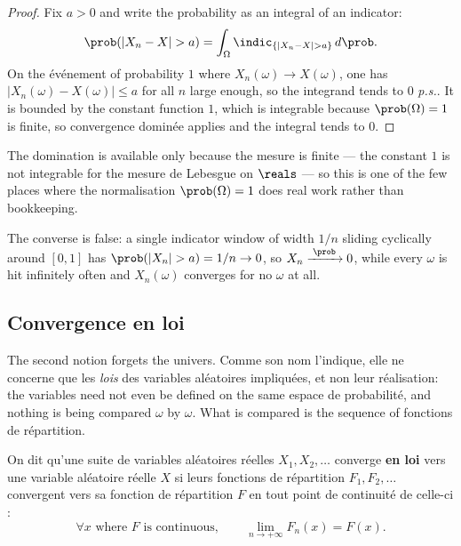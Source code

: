 \begin{proof}
  Fix $a > 0$ and write the probability as an integral of an indicator:
  \[
    \prob(|X_{n} - X| > a) = \int_{\Omega} \indic_{\{|X_{n} - X| > a\}}
      \, d\prob .
  \]
  On the événement of probability $1$ where $X_{n}(\omega) \to X(\omega)$, one
  has $|X_{n}(\omega) - X(\omega)| \leq a$ for all $n$ large enough, so the
  integrand tends to $0$ \textit{p.s.}. It is bounded by the constant function
  $1$, which is integrable because $\prob(\Omega) = 1$ is finite, so convergence
  dominée applies and the integral tends to $0$.
\end{proof}

\begin{remark}
  The domination is available only because the mesure is finite --- the
  constant $1$ is not integrable for the mesure de Lebesgue on $\reals$ --- so
  this is one of the few places where the normalisation $\prob(\Omega) = 1$ does
  real work rather than bookkeeping.
\end{remark}

\begin{remark}
  The converse is false: a single indicator window of width $1/n$ sliding
  cyclically around $[0,1]$ has $\prob(|X_{n}| > a) = 1/n \to 0$, so
  $X_{n} \cvP 0$, while every $\omega$ is hit infinitely often and
  $X_{n}(\omega)$ converges for no $\omega$ at all.
\end{remark}

\subsection{Convergence en loi}
The second notion forgets the univers. Comme son nom l'indique, elle ne concerne
que les \emph{lois} des variables aléatoires impliquées, et non leur
réalisation: the variables need not even be defined on the same espace de
probabilité, and nothing is being compared $\omega$ by $\omega$. What is
compared is the sequence of fonctions de répartition.

\begin{definition}
  On dit qu'une suite de variables aléatoires réelles $X_{1}, X_{2}, \dots$
  converge \textbf{en loi} vers une variable aléatoire réelle $X$ si leurs
  fonctions de répartition $F_{1}, F_{2}, \dots$ convergent vers sa fonction de
  répartition $F$ en tout point de continuité de celle-ci :
  \[
    \forall x \text{ where } F \text{ is continuous}, \qquad
      \lim_{n \to +\infty} F_{n}(x) = F(x) .
  \]
\end{definition}

